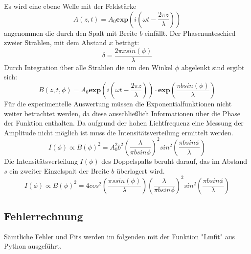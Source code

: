 Es wird eine ebene Welle mit der Feldstärke
\begin{equation}
  A(z,t)= A_0 \textbf{exp} \left( i \left( \omega t - \frac{2 \pi z}{\lambda}   \right) \right)
  \label{eqn:welle}
\end{equation}
angenommen die durch den Spalt mit Breite $b$ einfällt. Der Phasenunteschied zweier Strahlen, mit dem Abstand $x$ beträgt:
\begin{equation}
  \delta = \frac{2 \pi x sin(\phi)}{\lambda}
  \label{eqn:phase}
\end{equation}
Durch Integration über alle Strahlen die um den Winkel $\phi$ abgelenkt sind ergibt sich:
\begin{equation}
  B(z,t,\phi) = A_0 \textbf{exp} \left( i \left( \omega t - \frac{2 \pi z}{\lambda} \right) \right) \cdot \textbf{exp} \left( \frac{\pi b sin(\phi)}{\lambda} \right)
  \label{}
\end{equation}
Für die experimentelle Auswertung müssen die Exponentialfunktionen nicht weiter betrachtet werden, da diese ausschließlich Informationen über die Phase der Funktion enthalten. Da aufgrund der hohen Lichtfrequenz eine Messung der Amplitude nicht möglich ist muss die Intensitätsverteilung ermittelt werden.
\begin{equation}
  I(\phi) \propto B(\phi)^2 = A_0^2 b^2 \left( \frac{\lambda}{\pi b sin \phi} \right)^2 sin^2 \left( \frac{\pi b sin \phi}{\lambda} \right)
  \label{eqn:I}
\end{equation}
Die Intensitätsverteilung $I(\phi)$ des Doppelspalts beruht darauf, das im Abstand $s$ ein zweiter Einzelspalt der Breite $b$ überlagert wird.
\begin{equation}
  I(\phi) \propto B(\phi)^2 = 4cos^2\left( \frac{\pi s sin(\phi)}{\lambda} \right) \left( \frac{\lambda}{\pi b sin \phi} \right)^2 sin^2 \left( \frac{\pi b sin \phi}{\lambda} \right)
  \label{eqn:Id}
\end{equation}

\subsection{Fehlerrechnung}
Sämtliche Fehler und Fits werden im folgenden mit der Funktion "Lmfit" aus Python ausgeführt.
